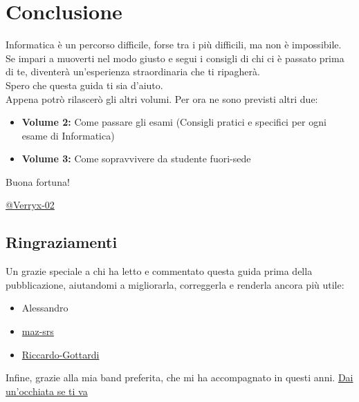\documentclass[18pt]{extarticle}
\begin{document}
\section{Conclusione}
Informatica è un percorso difficile, forse tra i più difficili, ma non è impossibile.\\
Se impari a muoverti nel modo giusto e segui i consigli di chi ci è passato prima di te, diventerà un'esperienza straordinaria che ti ripagherà.\\
Spero che questa guida ti sia d'aiuto.\\
Appena potrò rilascerò gli altri volumi. Per ora ne sono previsti altri due:
\begin{itemize}
\item \textbf{Volume 2:} Come passare gli esami (Consigli pratici e specifici per ogni esame di Informatica)
\item \textbf{Volume 3:} Come sopravvivere da studente fuori-sede
\end{itemize}

Buona fortuna!

\vspace{1cm}
\begin{flushright}
\href{https://github.com/Verryx-02}{@Verryx-02}
\end{flushright}

\subsection*{Ringraziamenti}
Un grazie speciale a chi ha letto e commentato questa guida prima della pubblicazione, aiutandomi a migliorarla, correggerla e renderla ancora più utile:
\begin{itemize}
\item Alessandro
\item \href{https://github.com/maz-srs}{maz-srs}
\item \href{https://github.com/Riccardo-Gottardi}{Riccardo-Gottardi}

\end{itemize}%
Infine, grazie alla mia band preferita, che mi ha accompagnato in questi anni. \href{https://www.youtube.com/watch?v=0dG9pXeOgT0}{Dai un'occhiata se ti va}
\end{document}
